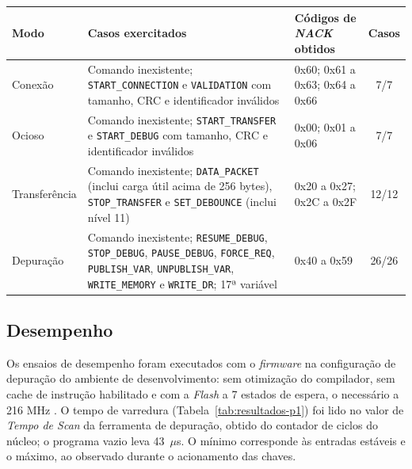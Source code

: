 \begin{quadrofixo}
    \centering
    \small
    \begin{tabular}{|l|p{5.6cm}|p{4.8cm}|c|}
        \hline
        Modo & Casos exercitados & Códigos de \textit{NACK} obtidos & Casos \\
        \hline
        Conexão & Comando inexistente; \texttt{START\_CONNECTION} e \texttt{VALIDATION} com tamanho, CRC e identificador inválidos & 0x60; 0x61 a 0x63; 0x64 a 0x66 & 7/7 \\
        \hline
        Ocioso & Comando inexistente; \texttt{START\_TRANSFER} e \texttt{START\_DEBUG} com tamanho, CRC e identificador inválidos & 0x00; 0x01 a 0x06 & 7/7 \\
        \hline
        Transferência & Comando inexistente; \texttt{DATA\_PACKET} (inclui carga útil acima de 256 bytes), \texttt{STOP\_TRANSFER} e \texttt{SET\_DEBOUNCE} (inclui nível 11) & 0x20 a 0x27; 0x2C a 0x2F & 12/12 \\
        \hline
        Depuração & Comando inexistente; \texttt{RESUME\_DEBUG}, \texttt{STOP\_DEBUG}, \texttt{PAUSE\_DEBUG}, \texttt{FORCE\_REQ}, \texttt{PUBLISH\_VAR}, \texttt{UNPUBLISH\_VAR}, \texttt{WRITE\_MEMORY} e \texttt{WRITE\_DR}; 17ª variável & 0x40 a 0x59 & 26/26 \\
        \hline
    \end{tabular}

    \label{qua:resultados-i2}
\end{quadrofixo}

\subsection{Desempenho}
\label{sub:resultados-desempenho}

Os ensaios de desempenho foram executados com o \textit{firmware} na configuração de depuração do ambiente de desenvolvimento: sem otimização do compilador, sem cache de instrução habilitado e com a \textit{Flash} a 7 estados de espera, o necessário a 216 MHz \cite{st:rm0410}.
O tempo de varredura (Tabela~\ref{tab:resultados-p1}) foi lido no valor de \textit{Tempo de Scan} da ferramenta de depuração, obtido do contador de ciclos do núcleo; o programa vazio leva 43~$\mu$s.
O mínimo corresponde às entradas estáveis e o máximo, ao observado durante o acionamento das chaves.

